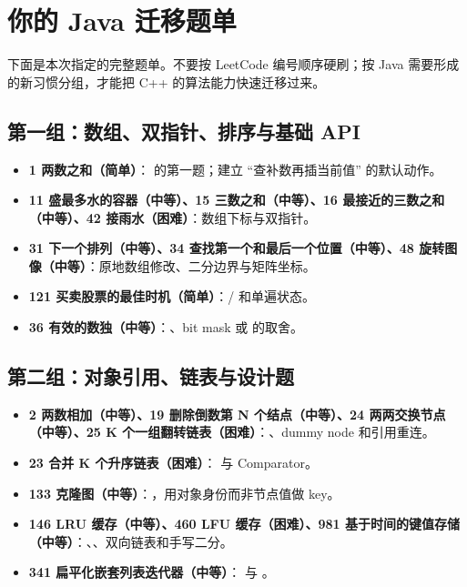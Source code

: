 \chapter{你的 Java 迁移题单}

下面是本次指定的完整题单。不要按 LeetCode 编号顺序硬刷；按 Java 需要形成的新习惯分组，才能把 C++ 的算法能力快速迁移过来。

\section{第一组：数组、双指针、排序与基础 API}

\begin{itemize}
  \item \textbf{1 两数之和（简单）}： 的第一题；建立 ``查补数再插当前值'' 的默认动作。
  \item \textbf{11 盛最多水的容器（中等）、15 三数之和（中等）、16 最接近的三数之和（中等）、42 接雨水（困难）}：数组下标与双指针。
  \item \textbf{31 下一个排列（中等）、34 查找第一个和最后一个位置（中等）、48 旋转图像（中等）}：原地数组修改、二分边界与矩阵坐标。
  \item \textbf{121 买卖股票的最佳时机（简单）}：/ 和单遍状态。
  \item \textbf{36 有效的数独（中等）}：、bit mask 或  的取舍。
\end{itemize}

\section{第二组：对象引用、链表与设计题}

\begin{itemize}
  \item \textbf{2 两数相加（中等）、19 删除倒数第 N 个结点（中等）、24 两两交换节点（中等）、25 K 个一组翻转链表（困难）}：、dummy node 和引用重连。
  \item \textbf{23 合并 K 个升序链表（困难）}： 与 Comparator。
  \item \textbf{133 克隆图（中等）}：，用对象身份而非节点值做 key。
  \item \textbf{146 LRU 缓存（中等）、460 LFU 缓存（困难）、981 基于时间的键值存储（中等）}：、、双向链表和手写二分。
  \item \textbf{341 扁平化嵌套列表迭代器（中等）}： 与 。
\end{itemize}

